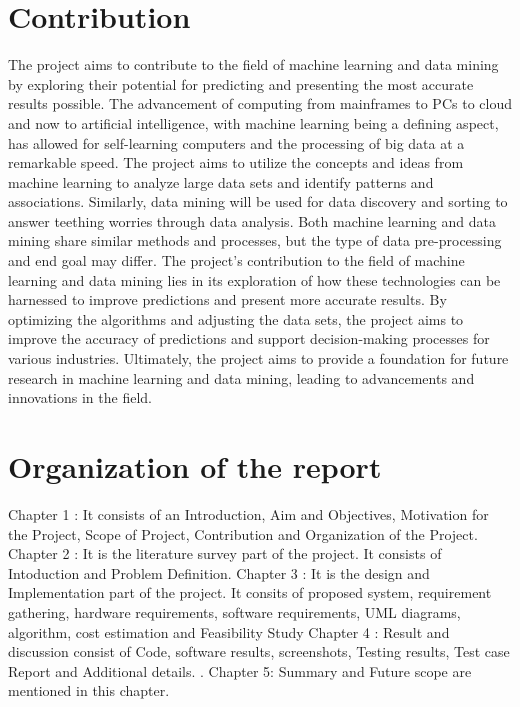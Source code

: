 \documentclass[a4paper, 12pt]{report}
\begin{document}
\section{Contribution }
\par The project aims to contribute to the field of machine learning and data mining by exploring their potential for predicting and presenting the most accurate results possible. The advancement of computing from mainframes to PCs to cloud and now to artificial intelligence, with machine learning being a defining aspect, has allowed for self-learning computers and the processing of big data at a remarkable speed.
The project aims to utilize the concepts and ideas from machine learning to analyze large data sets and identify patterns and associations. Similarly, data mining will be used for data discovery and sorting to answer teething worries through data analysis. Both machine learning and data mining share similar methods and processes, but the type of data pre-processing and end goal may differ.
The project's contribution to the field of machine learning and data mining lies in its exploration of how these technologies can be harnessed to improve predictions and present more accurate results. By optimizing the algorithms and adjusting the data sets, the project aims to improve the accuracy of predictions and support decision-making processes for various industries. Ultimately, the project aims to provide a foundation for future research in machine learning and data mining, leading to advancements and innovations in the field.


\section{Organization of the report }

Chapter 1 : It consists of an Introduction, Aim and Objectives, Motivation for the Project, Scope of Project, Contribution and Organization of the Project.\newline
Chapter 2 : It is the literature survey part of the project. It consists of Intoduction and Problem Definition.\newline
Chapter 3 : It is the design and Implementation part of the project. It consits of proposed system, requirement gathering, hardware requirements,  software requirements, UML diagrams, algorithm, cost estimation and Feasibility Study\newline
Chapter 4 : Result and discussion consist of Code, software results, screenshots, Testing results, Test case Report and Additional details. .\newline
Chapter 5: Summary and Future scope are mentioned in this chapter.
 
\end{document}
